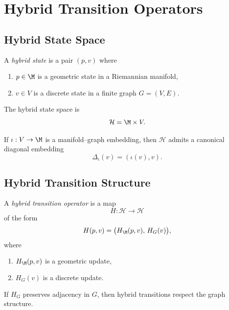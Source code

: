 
\section{Hybrid Transition Operators}

\subsection{Hybrid State Space}

\begin{definition}
A \emph{hybrid state} is a pair $(p,v)$ where
\begin{enumerate}
    \item $p \in \M$ is a geometric state in a Riemannian manifold,
    \item $v \in V$ is a discrete state in a finite graph $G = (V,E)$.
\end{enumerate}
The hybrid state space is
\[
\mathcal{H} = \M \times V.
\]
\end{definition}

\begin{lemma}
If $\iota : V \to \M$ is a manifold--graph embedding, then $\mathcal{H}$
admits a canonical diagonal embedding
\[
\Delta_\iota(v) = (\iota(v), v).
\]
\end{lemma}

\subsection{Hybrid Transition Structure}

\begin{definition}
A \emph{hybrid transition operator} is a map
\[
H : \mathcal{H} \to \mathcal{H}
\]
of the form
\[
H(p,v) = \big( H_\M(p,v),\, H_G(v) \big),
\]
where
\begin{enumerate}
    \item $H_\M(p,v)$ is a geometric update,
    \item $H_G(v)$ is a discrete update.
\end{enumerate}
\end{definition}

\begin{lemma}
If $H_G$ preserves adjacency in $G$, then hybrid transitions respect the
graph structure.
\end{lemma}

